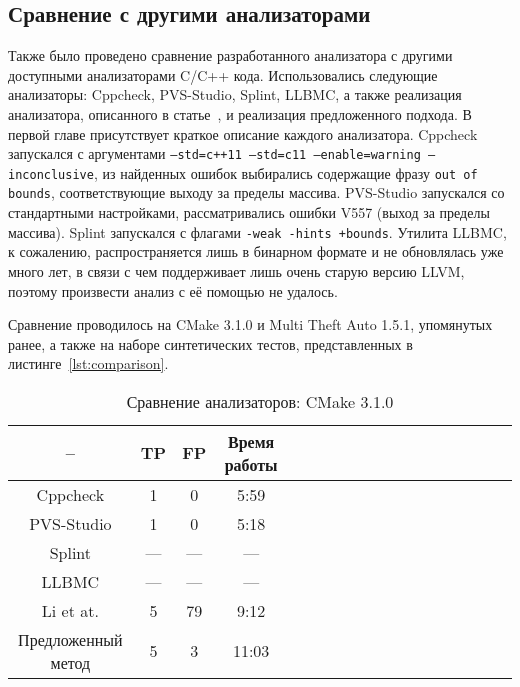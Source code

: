 \subsection{Сравнение с другими анализаторами}

Также было проведено сравнение разработанного анализатора с другими
доступными анализаторами C/C++ кода. Использовались следующие
анализаторы: Cppcheck, PVS-Studio, Splint, LLBMC, а
также реализация анализатора, описанного в
статье~\cite{li2010practical}, и реализация предложенного подхода. В
первой главе присутствует краткое описание каждого
анализатора. Cppcheck запускался с аргументами \texttt{--std=c++11
  --std=c11 --enable=warning --inconclusive}, из найденных ошибок
выбирались содержащие фразу \texttt{out of bounds}, соответствующие
выходу за пределы массива. PVS-Studio запускался со стандартными
настройками, рассматривались ошибки V557 (выход за пределы
массива). Splint запускался с флагами \texttt{-weak -hints
  +bounds}. Утилита LLBMC, к сожалению, распространяется лишь в
бинарном формате и не обновлялась уже много лет, в связи с чем
поддерживает лишь очень старую версию LLVM, поэтому произвести анализ
с её помощью не удалось.

Сравнение проводилось на CMake 3.1.0 и Multi Theft Auto 1.5.1,
упомянутых ранее, а также на наборе синтетических тестов,
представленных в листинге~\ref{lst:comparison}.

\begin{table}[!h]
\caption{Сравнение анализаторов: CMake 3.1.0}\label{tab:comparison-cmake}
\centering
  \begin{tabular}{|*{18}{c|}}\hline
  --                 & TP  & FP  & Время работы \\\hline
  Cppcheck           & 1   & 0   & 5:59         \\\hline
  PVS-Studio         & 1   & 0   & 5:18         \\\hline
  Splint             & --- & --- & ---          \\\hline
  LLBMC              & --- & --- & ---          \\\hline
  Li et at.          & 5   & 79  & 9:12         \\\hline
  Предложенный метод & 5   & 3   & 11:03        \\\hline
  \end{tabular}
\end{table}

